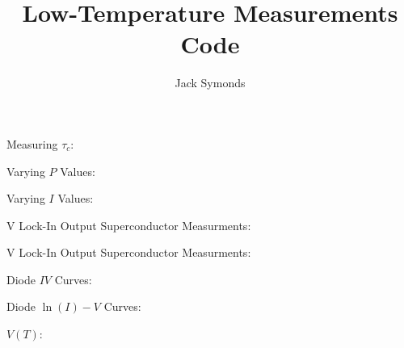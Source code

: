 \documentclass[8pt, a4paper]{article}
\title{Low-Temperature Measurements Code}
\author{Jack Symonds}
\date{}
\begin{document}
\maketitle

Measuring $\tau _c$:


\newpage
Varying $P$ Values:


\newpage
Varying $I$ Values:


 V Lock-In Output Superconductor Measurments:


 V Lock-In Output Superconductor Measurments:


\newpage
Diode $IV$ Curves:


\newpage
Diode $\ln (I)-V$ Curves:


\newpage
$V(T)$:

\end{document}
